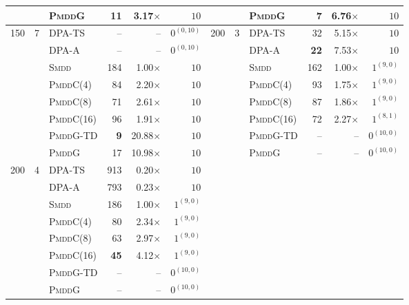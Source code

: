 \documentclass[letterpaper]{article}
\begin{document}
\begin{table}[t]
{\begin{tabular}{rrlrrrrrlrrr}
 &  & \textsc{PmddG} & 11 & 3.17$\times$ & $10$ &  &  & \textsc{PmddG} & 7 & 6.76$\times$ & $10$ \\
\midrule
\multirow{8}{*}{150} & \multirow{8}{*}{7} & DPA-TS & -- & -- & $0^{(0, 10)}$ & \multirow{8}{*}{200} & \multirow{8}{*}{3} & DPA-TS & 32 & 5.15$\times$ & $10$ \\
 &  & DPA-A & -- & -- & $0^{(0, 10)}$ &  &  & DPA-A & \textbf{22} & 7.53$\times$ & $10$ \\
 &  & \textsc{Smdd} & 184 & 1.00$\times$ & $10$ &  &  & \textsc{Smdd} & 162 & 1.00$\times$ & $1^{(9, 0)}$ \\
 &  & \textsc{PmddC}(4) & 84 & 2.20$\times$ & $10$ &  &  & \textsc{PmddC}(4) & 93 & 1.75$\times$ & $1^{(9, 0)}$ \\
 &  & \textsc{PmddC}(8) & 71 & 2.61$\times$ & $10$ &  &  & \textsc{PmddC}(8) & 87 & 1.86$\times$ & $1^{(9, 0)}$ \\
 &  & \textsc{PmddC}(16) & 96 & 1.91$\times$ & $10$ &  &  & \textsc{PmddC}(16) & 72 & 2.27$\times$ & $1^{(8, 1)}$ \\
 &  & \textsc{PmddG-TD} & \textbf{9} & 20.88$\times$ & $10$ &  &  & \textsc{PmddG-TD} & -- & -- & $0^{(10, 0)}$ \\
 &  & \textsc{PmddG} & 17 & 10.98$\times$ & $10$ &  &  & \textsc{PmddG} & -- & -- & $0^{(10, 0)}$ \\
\midrule
\multirow{8}{*}{200} & \multirow{8}{*}{4} & DPA-TS & 913 & 0.20$\times$ & $10$ &  &  &  &  &  &  \\
 &  & DPA-A & 793 & 0.23$\times$ & $10$ &  &  &  &  &  &  \\
 &  & \textsc{Smdd} & 186 & 1.00$\times$ & $1^{(9, 0)}$ &  &  &  &  &  &  \\
 &  & \textsc{PmddC}(4) & 80 & 2.34$\times$ & $1^{(9, 0)}$ &  &  &  &  &  &  \\
 &  & \textsc{PmddC}(8) & 63 & 2.97$\times$ & $1^{(9, 0)}$ &  &  &  &  &  &  \\
 &  & \textsc{PmddC}(16) & \textbf{45} & 4.12$\times$ & $1^{(9, 0)}$ &  &  &  &  &  &  \\
 &  & \textsc{PmddG-TD} & -- & -- & $0^{(10, 0)}$ &  &  &  &  &  &  \\
 &  & \textsc{PmddG} & -- & -- & $0^{(10, 0)}$ &  &  &  &  &  &  \\
\bottomrule
\end{tabular}
}
\label{tab:mospp_result}
\end{table}
\end{document}
